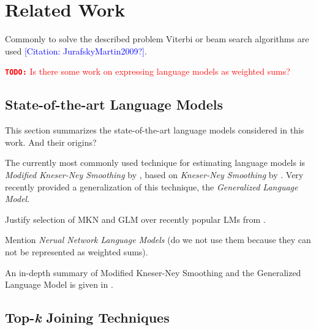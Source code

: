 \documentclass[m,bachelor,binding]{WeSTthesis}
\renewcommand\cref{\Cref}
\newenvironment{draft}{\color{draftcolor}}{}
\newcommand{\todo}[1]{\textcolor{red}{{\footnotesize\textbf{\texttt{TODO:}}} #1}}
\newcommand{\mbref}[1]{\textcolor{blue}{\footnotesize[Citation: #1?]}}
\begin{document}
\chapter{Related Work}

\begin{draft}
Commonly to solve the described problem Viterbi or beam search algorithms are
used \mbref{JurafskyMartin2009}.
\end{draft}

\todo{Is there some work on expressing language models as weighted sums?}

\section{State-of-the-art Language Models}

\begin{draft}
This section summarizes the state-of-the-art language models considered in this
work.
And their origins?
\end{draft}

The currently most commonly used \parencite{JurafskyMartin2009,Chelba2013}
technique for estimating language models is \emph{Modified Kneser-Ney Smoothing}
by \cite{ChenGoodman1996,ChenGoodman1998,ChenGoodman1999}, based on
\emph{Kneser-Ney Smoothing} by \cite{KneserNey1995}.
Very recently \cite{Pickhardt2014} provided a generalization of this technique,
the \emph{Generalized Language Model}.

\begin{draft}
Justify selection of MKN and GLM over recently popular LMs from
\parencite{Chelba2013}.

Mention \emph{Nerual Network Language Models} \parencite{Bengio2003,Mikolov2012}
(do we not use them because they can not be represented as weighted sums).
\end{draft}

An in-depth summary of Modified Kneser-Ney Smoothing and the Generalized
Language Model is given in \cref{ch:review-lm}.

\section{Top-\emph{k} Joining Techniques}
\end{document}

